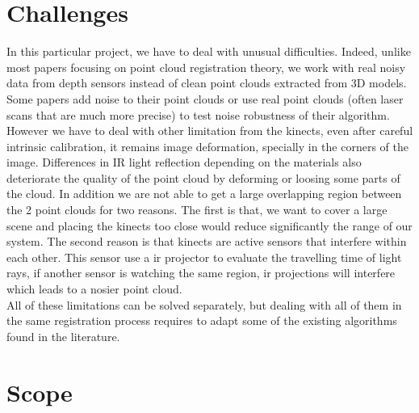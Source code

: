 \section{Challenges} \label{int:chall}

In this particular project, we have to deal with unusual difficulties. Indeed, unlike most papers focusing on point cloud registration theory, we work with real noisy data from depth sensors instead of clean point clouds extracted from 3D models. Some papers add noise to their point clouds or use real point clouds (often laser scans that are much more precise) to test noise robustness of their algorithm. However we have to deal with other limitation from the kinects, even after careful intrinsic calibration, it remains image deformation, specially in the corners of the image. Differences in IR light reflection depending on the materials also deteriorate the quality of the point cloud by deforming or loosing some parts of the cloud. In addition we are not able to get a large overlapping region between the 2 point clouds for two reasons. The first is that, we want to cover a large scene and placing the kinects too close would reduce significantly the range of our system. The second reason is that kinects are active sensors that interfere within each other. This sensor use a \acrshort{ir} projector to evaluate the travelling time of light rays, if another sensor is watching the same region, \acrshort{ir} projections will interfere which leads to a nosier point cloud. \\
All of these limitations can be solved separately, but dealing with all of them in the same registration process requires to adapt some of the existing algorithms found in the literature. \\

\section{Scope}

